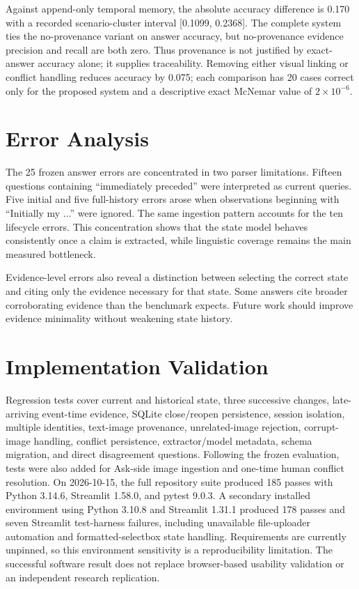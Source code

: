 \documentclass[conference]{IEEEtran}
\begin{document}
Against append-only temporal memory, the absolute accuracy difference is 0.170 with a recorded scenario-cluster interval [0.1099, 0.2368]. The complete system ties the no-provenance variant on answer accuracy, but no-provenance evidence precision and recall are both zero. Thus provenance is not justified by exact-answer accuracy alone; it supplies traceability. Removing either visual linking or conflict handling reduces accuracy by 0.075; each comparison has 20 cases correct only for the proposed system and a descriptive exact McNemar value of $2\times10^{-6}$.

\section{Error Analysis}
The 25 frozen answer errors are concentrated in two parser limitations. Fifteen questions containing ``immediately preceded'' were interpreted as current queries. Five initial and five full-history errors arose when observations beginning with ``Initially my ...'' were ignored. The same ingestion pattern accounts for the ten lifecycle errors. This concentration shows that the state model behaves consistently once a claim is extracted, while linguistic coverage remains the main measured bottleneck.

Evidence-level errors also reveal a distinction between selecting the correct state and citing only the evidence necessary for that state. Some answers cite broader corroborating evidence than the benchmark expects. Future work should improve evidence minimality without weakening state history.

\section{Implementation Validation}
Regression tests cover current and historical state, three successive changes, late-arriving event-time evidence, SQLite close/reopen persistence, session isolation, multiple identities, text-image provenance, unrelated-image rejection, corrupt-image handling, conflict persistence, extractor/model metadata, schema migration, and direct disagreement questions. Following the frozen evaluation, tests were also added for Ask-side image ingestion and one-time human conflict resolution. On 2026-10-15, the full repository suite produced 185 passes with Python 3.14.6, Streamlit 1.58.0, and pytest 9.0.3. A secondary installed environment using Python 3.10.8 and Streamlit 1.31.1 produced 178 passes and seven Streamlit test-harness failures, including unavailable file-uploader automation and formatted-selectbox state handling. Requirements are currently unpinned, so this environment sensitivity is a reproducibility limitation. The successful software result does not replace browser-based usability validation or an independent research replication.
\end{document}
